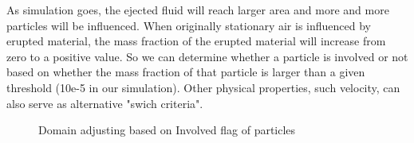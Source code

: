\documentclass[conference,compsoc]{IEEEtran}
\begin{document}
As simulation goes, the ejected fluid will reach larger area and more and more particles will be influenced. When originally stationary air is influenced by erupted material, the mass fraction of the erupted material will increase from zero to a positive value. So we can determine whether a particle is involved or not based on whether the mass fraction of that particle is larger than a given threshold (10e-5 in our simulation). Other physical properties, such velocity, can also serve as alternative "swich criteria".\\
\begin{figure}[!t]
\centering
{}
\label{fig:Involved_initial}
\hfil
{}
\label{fig:Involved_domain_adjusting}
\caption{Domain adjusting based on Involved flag of particles}
\label{fig:Domain_adjusting}
\end{figure}
\end{document}
